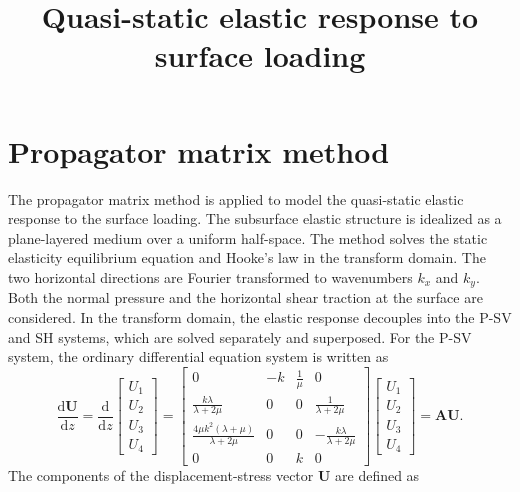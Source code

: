 \documentclass[11pt]{article}
\title{\vspace{-1em}Quasi-static elastic response to surface loading}
\date{\vspace{-3em}}
\begin{document}
\maketitle
\renewcommand{\baselinestretch}{1.25}

\section{Propagator matrix method}
\begin{large}
The propagator matrix method \citep{gilbert_1966, singh_1970} is applied to model the quasi-static elastic response to the surface loading. The subsurface elastic structure is idealized as a plane-layered medium over a uniform half-space. The method solves the static elasticity equilibrium equation and Hooke's law in the transform domain. The two horizontal directions are Fourier transformed to wavenumbers $k_x$ and $k_y$. Both the normal pressure and the horizontal shear traction at the surface are considered. In the transform domain, the elastic response decouples into the P-SV and SH systems, which are solved separately and superposed. For the P-SV system, the ordinary differential equation system is written as
\begin{equation}
    \frac{\mathrm{d}\mathbf{U}}{\mathrm{d}z} = \frac{\mathrm{d}}{\mathrm{d}z}
    \begin{bmatrix}
        U_1 \\ U_2 \\ U_3 \\ U_4
    \end{bmatrix} = \begin{bmatrix}
        0 & -k & \frac{1}{\mu} & 0 \\
        \frac{k\lambda}{\lambda+2\mu} & 0 & 0 & \frac{1}{\lambda+2\mu} \\
        \frac{4\mu k^2 (\lambda+\mu)}{\lambda+2\mu} & 0 & 0 & -\frac{k\lambda}{\lambda+2\mu} \\
        0 & 0 & k & 0
    \end{bmatrix} \begin{bmatrix}
        U_1 \\ U_2 \\ U_3 \\ U_4
    \end{bmatrix} = \mathbf{A}\mathbf{U}.
\label{elastic_ODE}
\end{equation}
The components of the displacement-stress vector $\mathbf{U}$ are defined as
\begin{equation}
\begin{aligned}

\end{aligned}
\end{equation}
\end{large}
\end{document}
